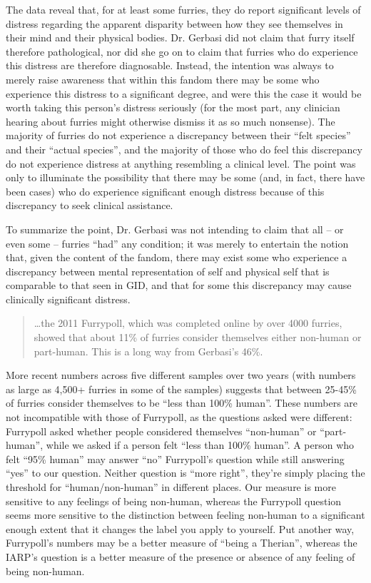 The data reveal that, for at least some furries, they do report significant levels of distress regarding the apparent disparity between how they see themselves in their mind and their physical bodies. Dr. Gerbasi did not claim that furry itself therefore pathological, nor did she go on to claim that furries who do experience this distress are therefore diagnosable. Instead, the intention was always to merely raise awareness that within this fandom there may be some who experience this distress to a significant degree, and were this the case it would be worth taking this person's distress seriously (for the most part, any clinician hearing about furries might otherwise dismiss it as so much nonsense). The majority of furries do not experience a discrepancy between their ``felt species'' and their ``actual species'', and the majority of those who do feel this discrepancy do not experience distress at anything resembling a clinical level. The point was only to illuminate the possibility that there may be some (and, in fact, there have been cases) who do experience significant enough distress because of this discrepancy to seek clinical assistance.

To summarize the point, Dr. Gerbasi was not intending to claim that all -- or even some -- furries ``had'' any condition; it was merely to entertain the notion that, given the content of the fandom, there may exist some who experience a discrepancy between mental representation of self and physical self that is comparable to that seen in GID, and that for some this discrepancy may cause clinically significant distress.

\begin{quote}
  \ldots the 2011 Furrypoll, which was completed online by over 4000 furries, showed that about 11\% of furries consider themselves either non-human or part-human. This is a long way from Gerbasi's 46\%.
\end{quote}

More recent numbers across five different samples over two years (with numbers as large as 4,500+ furries in some of the samples) suggests that between 25-45\% of furries consider themselves to be ``less than 100\% human''. These numbers are not incompatible with those of Furrypoll, as the questions asked were different: Furrypoll asked whether people considered themselves ``non-human'' or ``part-human'', while we asked if a person felt ``less than 100\% human''. A person who felt ``95\% human'' may answer ``no'' Furrypoll's question while still answering ``yes'' to our question. Neither question is ``more right'', they're simply placing the threshold for ``human/non-human'' in different places. Our measure is more sensitive to any feelings of being non-human, whereas the Furrypoll question seems more sensitive to the distinction between feeling non-human to a significant enough extent that it changes the label you apply to yourself. Put another way, Furrypoll's numbers may be a better measure of ``being a Therian'', whereas the IARP's question is a better measure of the presence or absence of any feeling of being non-human.

